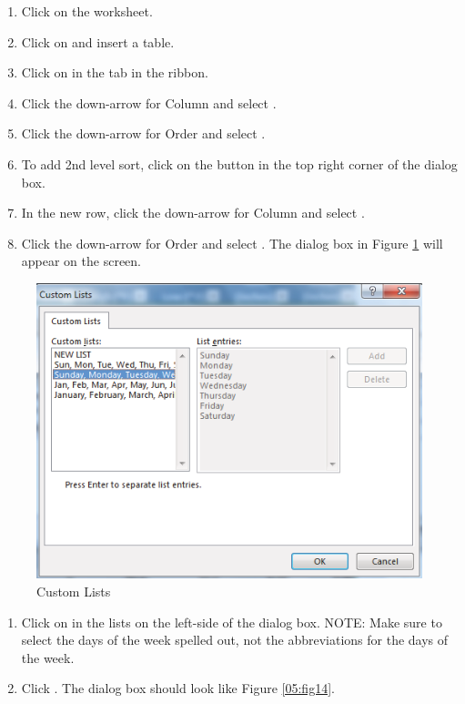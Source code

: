\begin{enumerate}
	\item Click on the  worksheet.
\item Click on  and insert a table.
\item Click on  in the  tab in the ribbon.
\item Click the down-arrow for Column and select .
\item Click the down-arrow for Order and select .
\item To add 2nd level sort, click on the  button in the top right corner of the dialog box.
\item In the new  row, click the down-arrow for Column and select .
\item Click the down-arrow for Order and select . The dialog box in Figure \ref{05:fig13} will appear on the screen.
\end{enumerate}

\begin{figure}[H]
	\centering
	\includegraphics[width=\maxwidth{.95\linewidth}]{gfx/ch05_fig13}
	\caption{Custom Lists}
	\label{05:fig13}
\end{figure}

\begin{enumerate}[resume]
	\item Click on  in the  lists on the left-side of the dialog box. NOTE: Make sure to select the days of the week spelled out, not the abbreviations for the days of the week.
	\item Click . The  dialog box should look like Figure \ref{05:fig14}.
\end{enumerate}

